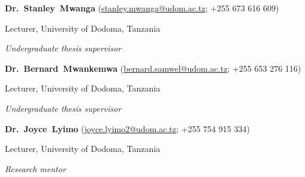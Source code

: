 \documentclass[10pt]{article}
\newcommand{\halfblankline}{\quad\vspace{-0.5\baselineskip}\pagebreak[3]}
\begin{document}
\halfblankline

{\textbf{Dr.~Stanley~Mwanga}}
(\href{mailto:stanley.mwanga@udom.ac.tz}{stanley.mwanga@udom.ac.tz}; +255 673 616 609)
\begin{innerlist}
    \item Lecturer, University of Dodoma, Tanzania
    \item[$\star$] \emph{Undergraduate thesis supervisor}
\end{innerlist}

\halfblankline

{\textbf{Dr.~Bernard~Mwankemwa}}
(\href{mailto:bernard.samwel@udom.ac.tz}{bernard.samwel@udom.ac.tz}; +255 653 276 116)
\begin{innerlist}
    \item Lecturer, University of Dodoma, Tanzania
    \item[$\star$] \emph{Undergraduate thesis supervisor}
\end{innerlist}

\halfblankline

{\textbf{Dr.~Joyce~Lyimo}}
(\href{mailto:joyce.lyimo2@udom.ac.tz}{joyce.lyimo2@udom.ac.tz}; +255 754 915 334)
\begin{innerlist}
    \item Lecturer, University of Dodoma, Tanzania
    \item[$\star$] \emph{Research mentor}
\end{innerlist}
\end{document}
